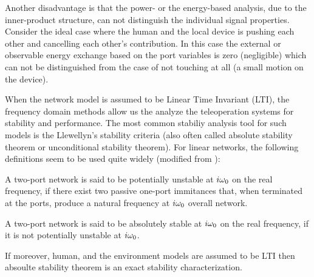Another disadvantage is that the power- or the energy-based analysis, due to the inner-product structure, can not distinguish the individual 
signal properties. Consider the ideal case where the human and the local device is pushing each other and cancelling each other's contribution. 
In this case the external or observable energy exchange based on the port variables is zero (negligible) which can not be distinguished from 
the case of not touching at all (a small motion on the device). 


When the network model is assumed to be Linear Time Invariant (LTI), the frequency domain methods
allow us the analyze the teleoperation systems for stability and performance. The most common stabiliy analysis tool for such 
models is the Llewellyn's stability criteria (also often called absolute stability theorem or unconditional stability theorem). 
For linear networks, the following definitions seem to be used quite widely (modified from \cite{chen91}): 

\begin{define} A two-port network is said to be potentially unstable at $i\omega_0$ on the real frequency, 
if there exist two passive one-port immitances that, when terminated at the ports, produce a natural frequency at $i\omega_0$ overall network.   
\end{define}

\begin{define} A two-port network is said to be absolutely stable at $i\omega_0$ on the real frequency, 
if it is not potentially unstable at $i\omega_0$.   
\end{define}

If moreover,  human, and the environment models are assumed to be LTI then absoulte stability theorem is an exact stability characterization. 

